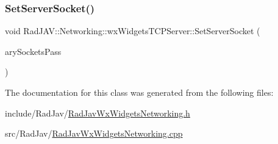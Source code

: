 \mbox{\label{class_rad_j_a_v_1_1_networking_1_1wx_widgets_t_c_p_server_a3e088be7abe0d7306546bc76f665a24e}} 
\subsubsection{\texorpdfstring{Set\+Server\+Socket()}{SetServerSocket()}}
{\footnotesize\ttfamily void Rad\+J\+A\+V\+::\+Networking\+::wx\+Widgets\+T\+C\+P\+Server\+::\+Set\+Server\+Socket (\begin{DoxyParamCaption}\item[{wx\+Socket\+Server $\ast$}]{ary\+Sockets\+Pass }\end{DoxyParamCaption})}



The documentation for this class was generated from the following files\+:\begin{DoxyCompactItemize}
\item 
include/\+Rad\+Jav/\mbox{\hyperlink{_rad_jav_wx_widgets_networking_8h}{Rad\+Jav\+Wx\+Widgets\+Networking.\+h}}\item 
src/\+Rad\+Jav/\mbox{\hyperlink{_rad_jav_wx_widgets_networking_8cpp}{Rad\+Jav\+Wx\+Widgets\+Networking.\+cpp}}\end{DoxyCompactItemize}
